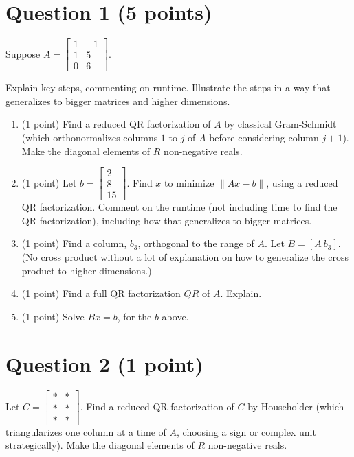 \documentclass[lang=cn,11pt]{elegantbook}
\begin{document}
\section*{Question 1 (5 points)}

Suppose \( A = \begin{bmatrix} 1 & -1 \\ 1 & 5 \\ 0 & 6 \end{bmatrix} \).

Explain key steps, commenting on runtime. Illustrate the steps in a way that generalizes to bigger matrices and higher dimensions.

\begin{enumerate}
    \item[(a)] (1 point) Find a reduced QR factorization of \( A \) by classical Gram-Schmidt (which orthonormalizes columns \( 1 \) to \( j \) of \( A \) before considering column \( j+1 \)). Make the diagonal elements of \( R \) non-negative reals.
    
    \item[(b)] (1 point) Let \( b = \begin{bmatrix} 2 \\ 8 \\ 15 \end{bmatrix} \). Find \( x \) to minimize \( \|Ax-b\| \), using a reduced QR factorization. Comment on the runtime (not including time to find the QR factorization), including how that generalizes to bigger matrices.
    
    \item[(c)] (1 point) Find a column, \( b_3 \), orthogonal to the range of \( A \). Let \( B = [A \ b_3] \). (No cross product without a lot of explanation on how to generalize the cross product to higher dimensions.)
    
    \item[(d)] (1 point) Find a full QR factorization \( QR \) of \( A \). Explain.
    
    \item[(e)] (1 point) Solve \( Bx = b \), for the \( b \) above.
\end{enumerate}

\section*{Question 2 (1 point)}

Let \( C = \begin{bmatrix} * & * \\ * & * \\ * & * \end{bmatrix} \). Find a reduced QR factorization of \( C \) by Householder (which triangularizes one column at a time of \( A \), choosing a sign or complex unit strategically). Make the diagonal elements of \( R \) non-negative reals.
\end{document}
